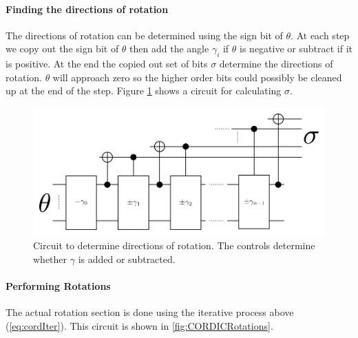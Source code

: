         \paragraph{Finding the directions of rotation}
            The directions of rotation can be determined using the sign bit of $\theta$.
            At each step we copy out the sign bit of $\theta$ then add the angle $\gamma_i$ if $\theta$ is negative or subtract if it is positive.
            At the end the copied out set of bits $\sigma$ determine the directions of rotation.
            $\theta$ will approach zero so the higher order bits could possibly be cleaned up at the end of the step.
            Figure \ref{fig:CORDICDirections} shows a circuit for calculating $\sigma$.
            \begin{figure}
                \capstart
                \centering
                \includegraphics[width=\textwidth]{images/CORDICDirections}
                \caption{Circuit to determine directions of rotation.  The controls determine whether $\gamma$ is added or subtracted.}
                \label{fig:CORDICDirections}
            \end{figure}

        \paragraph{Performing Rotations}

            The actual rotation section is done using the iterative process
            above (\cref{eq:cordIter}). This circuit is shown in
            \cref{fig:CORDICRotations}.

